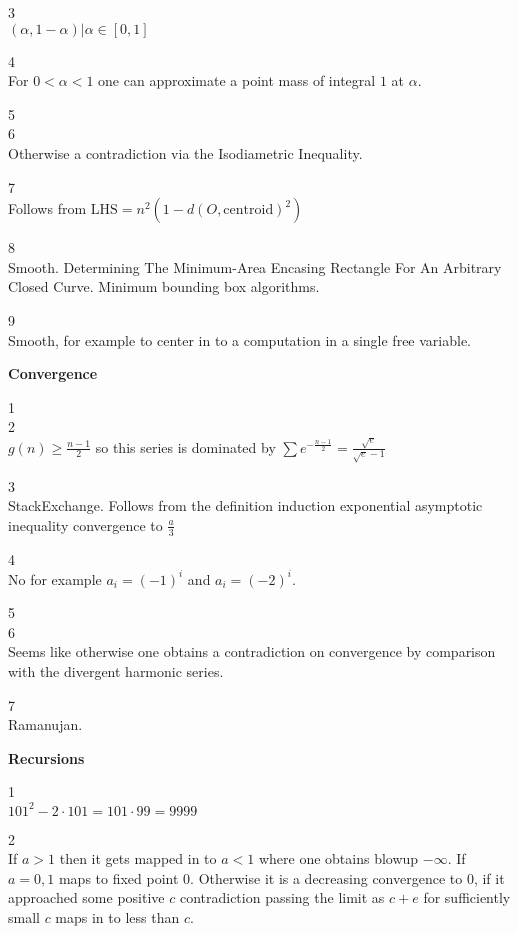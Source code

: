 3 \\
$\boxed{(\alpha,1-\alpha)| \alpha \in [0,1]}$

4 \\
For $0<\alpha<1$ one can approximate a point mass of integral $1$ at $\alpha$.

5 \\


6 \\
Otherwise a contradiction via the Isodiametric Inequality.

7 \\
Follows from $\text{LHS}=n^2(1-d(O,\text{centroid})^2)$

8 \\
Smooth. Determining The Minimum-Area Encasing Rectangle For An Arbitrary Closed Curve. Minimum bounding box algorithms.

9 \\
Smooth, for example to center in to a computation in a single free variable.

\newpage

\textbf{Convergence}

1 \\


2 \\
$g(n) \ge \frac{n-1}{2}$ so this series is dominated by $\sum e^{-\frac{n-1}{2}}=\frac{\sqrt{e}}{\sqrt{e}-1}$

3 \\
StackExchange. Follows from the definition induction exponential asymptotic inequality convergence to $\frac{a}{3}$

4 \\
No for example $a_i=(-1)^i$ and $a_i=(-2)^i$.

5 \\


6 \\
Seems like otherwise one obtains a contradiction on convergence by comparison with the divergent harmonic series.

7 \\
Ramanujan.

\newpage

\textbf{Recursions}

1 \\
$101^2-2\cdot 101=101\cdot 99=\boxed{9999}$

2 \\
If $a>1$ then it gets mapped in to $a<1$ where one obtains blowup $-\infty$. If $a=0,1$ maps to fixed point $0$. Otherwise it is a decreasing convergence to $0$, if it approached some positive $c$ contradiction passing the limit as $c+e$ for sufficiently small $c$ maps in to less than $c$.

